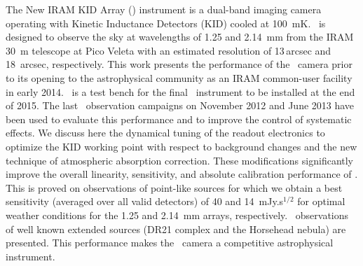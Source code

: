 \abstract
{The New IRAM KID Array (\NIKA) instrument is a dual-band imaging camera
operating with Kinetic Inductance Detectors (KID) cooled at 100~mK.  \NIKA\
is designed to observe the sky at wavelengths of 1.25 and 2.14~mm from
the IRAM 30~m telescope at Pico Veleta with an estimated resolution of 13\,arcsec
and 18~arcsec, respectively.  This work presents the performance
of the \NIKA\ camera prior to its opening to the astrophysical community as an
IRAM common-user facility in early 2014. \NIKA\ is a test bench for
the final \NIKAii\ instrument to be installed at the end of 2015. The last
\NIKA\ observation campaigns on November 2012 and June 2013 have been used to
evaluate this performance and to improve the control of systematic effects.
We discuss here the dynamical tuning of the readout electronics to optimize the
KID working point with respect to background changes and the new technique of atmospheric absorption correction. These modifications significantly improve the overall linearity, sensitivity, and absolute calibration
performance of \NIKA. This is proved on observations of point-like sources for
which we obtain a best sensitivity (averaged over all valid detectors) of 40 and
14~mJy.s$^{1/2}$ for optimal weather conditions for the 1.25 and 2.14~mm arrays,
respectively.  \NIKA\ observations of well known extended sources (DR21
complex and the Horsehead nebula) are presented.  This performance
makes the \NIKA\ camera a competitive astrophysical instrument.}

